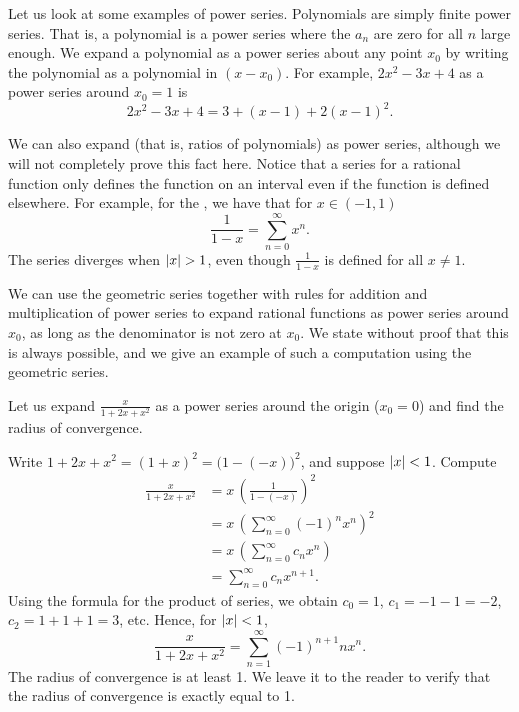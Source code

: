 Let us look at some examples of power series.
Polynomials are simply finite power series.  That is, a polynomial
is a power series where
the $a_n$ are zero for all $n$ large enough.  We expand
a polynomial as a power series about any point $x_0$ by writing
the polynomial as a polynomial in $(x-x_0)$.  For example,
$2x^2-3x+4$ as a power series around $x_0 = 1$ is
\begin{equation*}
2x^2-3x+4 = 3 + (x-1) + 2{(x-1)}^2 .
\end{equation*}

We can also expand
\emph{} (that is, ratios of polynomials)
as power series, although we will not completely prove this fact here.
Notice that a series for a rational function only defines the function
on an interval even if the function is defined elsewhere.  For example, for
the \emph{}, we have that for
$x \in (-1,1)$
\begin{equation*}
\frac{1}{1-x} =
\sum_{n=0}^\infty x^n .
\end{equation*}
The series diverges when $\left\lvert {x} \right\rvert > 1$, even though $\frac{1}{1-x}$ is
defined for all $x \not= 1$.

We can use the geometric series together with rules for addition and
multiplication of power series to expand rational functions as power
series around $x_0$,
as long as the denominator is not zero at $x_0$.  We state without
proof that this is always possible, and we give an example of such
a computation using the geometric series.

\begin{example}
Let us expand $\frac{x}{1+2x+x^2}$ as a power series around the origin ($x_0 = 0$) and
find the radius of convergence.

Write $1+2x+x^2 = {(1+x)}^2 = {\bigl(1-(-x)\bigr)}^2$, and suppose
$\left\lvert {x} \right\rvert < 1$.  Compute
\begin{equation*}
\begin{split}
\frac{x}{1+2x+x^2}
&=
x \,
{\left(
\frac{1}{1-(-x)}
\right)}^2
\\
&=
x \,
{\left( 
\sum_{n=0}^\infty {(-1)}^n x^n 
\right)}^2
\\
&=
x \,
\left(
\sum_{n=0}^\infty c_n x^n 
\right)
\\
&=
\sum_{n=0}^\infty c_n x^{n+1} .
\end{split}
\end{equation*}
Using the formula for the product of series,
we obtain $c_0 = 1$, $c_1 = -1 -1 = -2$, $c_2 = 1+1+1 = 3$, etc.
Hence, for $\left\lvert {x} \right\rvert < 1$, 
\begin{equation*}
\frac{x}{1+2x+x^2}
=
\sum_{n=1}^\infty {(-1)}^{n+1} n x^n .
\end{equation*}
The radius of convergence is at least 1.  We leave it to the reader to
verify that the radius of convergence is exactly equal to 1.
\end{example}

